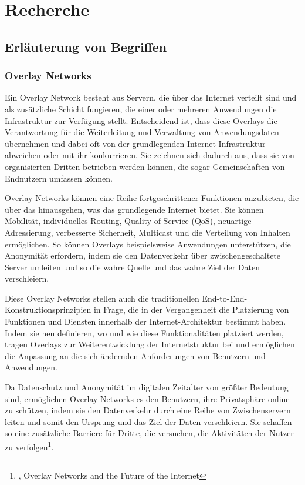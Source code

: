 \section{Recherche}

\subsection{Erläuterung von Begriffen}

\subsubsection{Overlay Networks}

Ein Overlay Network besteht aus Servern, die über das Internet verteilt sind und als zusätzliche Schicht fungieren, die einer oder mehreren Anwendungen die Infrastruktur zur Verfügung stellt. Entscheidend ist, dass diese Overlays die Verantwortung für die Weiterleitung und Verwaltung von Anwendungsdaten übernehmen und dabei oft von der grundlegenden Internet-Infrastruktur abweichen oder mit ihr konkurrieren.\footnotemark{} Sie zeichnen sich dadurch aus, dass sie von organisierten Dritten betrieben werden können, die sogar Gemeinschaften von Endnutzern umfassen können.

Overlay Networks können eine Reihe fortgeschrittener Funktionen anzubieten, die über das hinausgehen, was das grundlegende Internet bietet. Sie können Mobilität, individuelles Routing, Quality of Service (QoS), neuartige Adressierung, verbesserte Sicherheit, Multicast und die Verteilung von Inhalten ermöglichen. So können Overlays beispielsweise Anwendungen unterstützen, die Anonymität erfordern, indem sie den Datenverkehr über zwischengeschaltete Server umleiten und so die wahre Quelle und das wahre Ziel der Daten verschleiern.

Diese Overlay Networks stellen auch die traditionellen End-to-End-Konstruktionsprinzipien in Frage, die in der Vergangenheit die Platzierung von Funktionen und Diensten innerhalb der Internet-Architektur bestimmt haben. Indem sie neu definieren, wo und wie diese Funktionalitäten platziert werden, tragen Overlays zur Weiterentwicklung der Internetstruktur bei und ermöglichen die Anpassung an die sich ändernden Anforderungen von Benutzern und Anwendungen.

Da Datenschutz und Anonymität im digitalen Zeitalter von größter Bedeutung sind, ermöglichen Overlay Networks es den Benutzern, ihre Privatsphäre online zu schützen, indem sie den Datenverkehr durch eine Reihe von Zwischenservern leiten und somit den Ursprung und das Ziel der Daten verschleiern. Sie schaffen so eine zusätzliche Barriere für Dritte, die versuchen, die Aktivitäten der Nutzer zu verfolgen\footnote{\cite{FutureOfTheInternet}, Overlay Networks and the Future of the Internet}.

